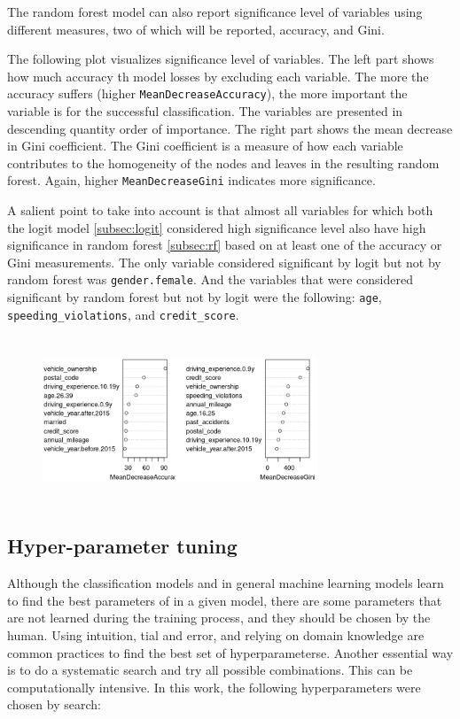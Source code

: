 \documentclass{article}
\begin{document}
The random forest model can also report significance level of variables
using different measures, two of which will be reported, accuracy, and
Gini.

The following plot visualizes significance level of variables. The left
part shows how much accuracy th model losses by excluding each variable.
The more the accuracy suffers (higher \texttt{MeanDecreaseAccuracy}),
the more important the variable is for the successful classification.
The variables are presented in descending quantity order of importance.
The right part shows the mean decrease in Gini coefficient. The Gini
coefficient is a measure of how each variable contributes to the
homogeneity of the nodes and leaves in the resulting random forest.
Again, higher \texttt{MeanDecreaseGini} indicates more significance.

A salient point to take into account is that almost all variables for
which both the logit model \ref{subsec:logit} considered high
significance level also have high significance in random forest
\ref{subsec:rf} based on at least one of the accuracy or Gini
measurements. The only variable considered significant by logit but not
by random forest was \texttt{gender.female}. And the variables that were
considered significant by random forest but not by logit were the
following: \texttt{age}, \texttt{speeding\_violations}, and
\texttt{credit\_score}.

\begin{figure}[H] 
    \centerline{\includegraphics[width=8.2cm, height=5cm]{./figures/varimp.png}}
\end{figure}

\hypertarget{hyper-parameter-tuning}{%
\subsection{\texorpdfstring{Hyper-parameter tuning
\label{subsec:hyperpar}}{Hyper-parameter tuning }}\label{hyper-parameter-tuning}}

Although the classification models and in general machine learning
models learn to find the best parameters of in a given model, there are
some parameters that are not learned during the training process, and
they should be chosen by the human. Using intuition, tial and error, and
relying on domain knowledge are common practices to find the best set of
hyperparameterse. Another essential way is to do a systematic search and
try all possible combinations. This can be computationally intensive. In
this work, the following hyperparameters were chosen by search:
\end{document}
